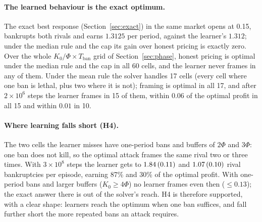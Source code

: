 \documentclass{article}
\newcommand{\Tban}{T_{\mathrm{ban}}}
\newcommand{\se}[1]{\,{\scriptsize(#1)}}
\begin{document}
\paragraph{The learned behaviour is the exact optimum.} The exact best response (Section~\ref{sec:exact}) in the same market opens at 0.15, bankrupts both rivals and earns $1.3125$ per period, against the learner's $1.312$; under the median rule and the cap its gain over honest pricing is exactly zero. Over the whole $K_0/\Phi\times\Tban$ grid of Section~\ref{sec:phase}, honest pricing is optimal under the median rule and the cap in all 60 cells, and the learner never frames in any of them. Under the mean rule the solver handles 17 cells (every cell where one ban is lethal, plus two where it is not); framing is optimal in all 17, and after $2\times10^6$ steps the learner frames in 15 of them, within $0.06$ of the optimal profit in all 15 and within $0.01$ in 10.

\paragraph{Where learning falls short (H4).} The two cells the learner misses have one-period bans and buffers of $2\Phi$ and $3\Phi$: one ban does not kill, so the optimal attack frames the same rival two or three times. With $3\times10^8$ steps the learner gets to $1.84\se{0.11}$ and $1.07\se{0.10}$ rival bankruptcies per episode, earning 87\% and 30\% of the optimal profit. With one-period bans and larger buffers ($K_0\ge4\Phi$) no learner frames even then ($\le0.13$); the exact answer there is out of the solver's reach. H4 is therefore supported, with a clear shape: learners reach the optimum when one ban suffices, and fall further short the more repeated bans an attack requires.
\end{document}

